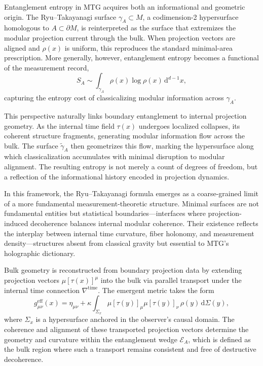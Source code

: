 \documentclass[11pt]{article}
\begin{document}
Entanglement entropy in MTG acquires both an informational and geometric origin. The Ryu--Takayanagi surface \( \gamma_A \subset M \), a codimension-2 hypersurface homologous to \( A \subset \partial M \), is reinterpreted as the surface that extremizes the modular projection current through the bulk. When projection vectors are aligned and \( \rho(x) \) is uniform, this reproduces the standard minimal-area prescription. More generally, however, entanglement entropy becomes a functional of the measurement record,
\begin{equation}
S_A \sim \int_{\gamma_A} \rho(x) \log \rho(x) \, \mathrm{d}^{d-1} x,
\end{equation}
capturing the entropy cost of classicalizing modular information across \( \gamma_A \).

This perspective naturally links boundary entanglement to internal projection geometry. As the internal time field \( \tau(x) \) undergoes localized collapses, its coherent structure fragments, generating modular information flow across the bulk. The surface \( \widetilde{\gamma}_A \) then geometrizes this flow, marking the hypersurface along which classicalization accumulates with minimal disruption to modular alignment. The resulting entropy is not merely a count of degrees of freedom, but a reflection of the informational history encoded in projection dynamics.

In this framework, the Ryu--Takayanagi formula emerges as a coarse-grained limit of a more fundamental measurement-theoretic structure. Minimal surfaces are not fundamental entities but statistical boundaries—interfaces where projection-induced decoherence balances internal modular coherence. Their existence reflects the interplay between internal time curvature, fiber holonomy, and measurement density—structures absent from classical gravity but essential to MTG’s holographic dictionary.

Bulk geometry is reconstructed from boundary projection data by extending projection vectors \( \mu[\tau(x)]^\mu \) into the bulk via parallel transport under the internal time connection \( \nabla^{\mathrm{time}} \). The emergent metric takes the form
\begin{equation}
g^{\mathrm{eff}}_{\mu\nu}(x) = \eta_{\mu\nu} + \kappa \int_{\Sigma_x} \mu[\tau(y)]_\mu \mu[\tau(y)]_\nu \, \rho(y) \, \mathrm{d}\Sigma(y),
\end{equation}
where \( \Sigma_x \) is a hypersurface anchored in the observer’s causal domain. The coherence and alignment of these transported projection vectors determine the geometry and curvature within the entanglement wedge \( \mathcal{E}_A \), which is defined as the bulk region where such a transport remains consistent and free of destructive decoherence.
\end{document}
